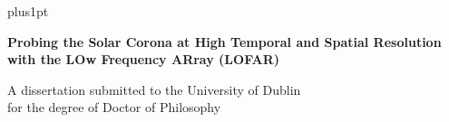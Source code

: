 \documentclass[a4paper,oneside,12pt,usenatbib]{Latex/Classes/PhDthesisPSnPDF}
\begin{document}

\renewcommand\baselinestretch{1.2}
\baselineskip=18pt plus1pt


\newcommand{\titlefont}{\bfseries \fontsize{22}{26.42pt}\selectfont}
\newcommand{\largetitlefont}{\bfseries \fontsize{29.88}{35.88pt}\selectfont}
\newcommand{\othertitlefont}{\fontsize{14.4}{17.28}\selectfont}
\newcommand{\authorfont}{\bfseries \fontsize{14.4}{17.28}\selectfont}
\newcommand{\informationfont}{\fontsize{10}{12}\selectfont}
\newcommand{\dedicationfont}{\slshape \fontsize{14.4}{17.28}\selectfont}

\newcommand{\thisyear}{\number\year}
\def\thismonth{\ifcase\month\or January\or February\or March\or
  April\or May\or June\or July\or August\or September\or October\or November\or December\fi}
\newcommand{\todaysdate}{\thismonth\space \thisyear}

\renewcommand{\baselinestretch}{1}
\newpage \thispagestyle{empty}
\vspace*{1.5cm}
\begin{flushright}



\Huge{\textbf{Probing the Solar Corona at High Temporal and Spatial Resolution with the LOw Frequency ARray (LOFAR)}}

\end{flushright}

\vspace*{3cm}
\begin{flushright}
A dissertation submitted to the University of Dublin \\
for the degree of Doctor of Philosophy
\end{flushright}
\end{document}
